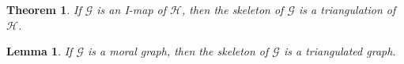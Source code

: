 \documentclass[11pt]{article}
\numberwithin{equation}{section}
\theoremstyle{boldStyle}
\theoremstyle{boldBlueStyle}
\newtheorem{lemma}{Lemma}[section]
\theoremstyle{boldPurpleStyle}
\newtheorem{theorem}{Theorem}[section]
\theoremstyle{boldRedStyle}
\begin{document}
\begin{theorem}
    If $\mathcal{G}$ is an I-map of $\mathcal{H}$, then the skeleton of $\mathcal{G}$ is a triangulation of $\mathcal{H}$.
\end{theorem}

\begin{lemma}
    If $\mathcal{G}$ is a moral graph, then the skeleton of $\mathcal{G}$ is a triangulated graph.
\end{lemma}







\end{document}
